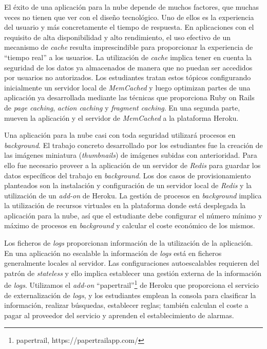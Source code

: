 \documentclass[conference]{IEEEtran}
\begin{document}
El éxito de una aplicación para la nube depende de muchos factores, que muchas veces no tienen que ver con el diseño tecnológico.
Uno de ellos es la experiencia del usuario y más concretamente el tiempo de respuesta.
En aplicaciones con el requisito de alta disponibilidad y alto rendimiento, el uso efectivo de un mecanismo de \textit{cache} resulta imprescindible para proporcionar la experiencia de ``tiempo real'' a los usuarios.
La utilización de \textit{cache} implica tener en cuenta la seguridad de los datos ya almacenados de manera que no puedan ser accedidos por usuarios no autorizados.
Los estudiantes tratan estos tópicos configurando inicialmente un servidor local de \textit{MemCached} \cite{Soliman:2013} y luego optimizan partes de una aplicación ya desarrollada mediante las técnicas que proporciona Ruby on Rails de
\textit{page caching}, \textit{action caching} y \textit{fragment caching}. En una segunda parte, mueven la aplicación y el servidor de \textit{MemCached} a la plataforma Heroku.



Una aplicación para la nube casi con toda seguridad utilizará procesos en \textit{background}. El trabajo concreto desarrollado por los estudiantes fue la creación de las imágenes  miniatura
(\textit{thumbnails}) de imágenes subidas con anterioridad. Para ello fue necesario proveer a la aplicación de un servidor de \textit{Redis} \cite{Carlson1:2013} para guardar los datos específicos del trabajo en 
\textit{background}. Los dos casos de provisionamiento planteados son la instalación y configuración de un servidor local de \textit{Redis} y la utilización de un \textit{add-on} de Heroku.
La gestión de  procesos en \textit{background} implica la utilización de recursos virtuales en la plataforma donde está desplegada la aplicación para la nube,
así que el estudiante debe configurar el número mínimo y máximo de procesos en \textit{background} y calcular el coste económico de los mismos.
 

Los ficheros de \textit{logs} proporcionan información de la utilización de la aplicación. En una aplicación no escalable la información de \textit{logs} está en ficheros generalmente locales al servidor.
Las configuraciones autoescalables requieren del patrón de \textit{stateless} y ello implica establecer una gestión externa de la información de \textit{logs}.
Utilizamos el \textit{add-on} ``papertrail''\footnote{papertrail, https://papertrailapp.com/} de Heroku que proporciona el servicio de externalización de \textit{logs}, y los estudiantes emplean la consola para clasificar la información,
realizar búsquedas, establecer reglas; también calculan el coste a pagar al proveedor del servicio y aprenden el establecimiento de alarmas.
\end{document}
